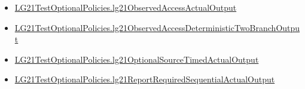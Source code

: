 \documentclass[10pt]{article}
\begin{document}
\begin{itemize}
\item \hyperlink{governing-declaration-58b46528d47b6306}{LG21\allowbreak{}Test\allowbreak{}Optional\allowbreak{}Policies.\allowbreak{}lg21\allowbreak{}Observed\allowbreak{}Access\allowbreak{}Actual\allowbreak{}Output}
\item \hyperlink{governing-declaration-7b2a7d48223f30ef}{LG21\allowbreak{}Test\allowbreak{}Optional\allowbreak{}Policies.\allowbreak{}lg21\allowbreak{}Observed\allowbreak{}Access\allowbreak{}Deterministic\allowbreak{}Two\allowbreak{}Branch\allowbreak{}Output}
\item \hyperlink{governing-declaration-d65503c7a908c20a}{LG21\allowbreak{}Test\allowbreak{}Optional\allowbreak{}Policies.\allowbreak{}lg21\allowbreak{}Optional\allowbreak{}Source\allowbreak{}Timed\allowbreak{}Actual\allowbreak{}Output}
\item \hyperlink{governing-declaration-44fa832554c59dfe}{LG21\allowbreak{}Test\allowbreak{}Optional\allowbreak{}Policies.\allowbreak{}lg21\allowbreak{}Report\allowbreak{}Required\allowbreak{}Sequential\allowbreak{}Actual\allowbreak{}Output}
\end{itemize}
\end{document}
